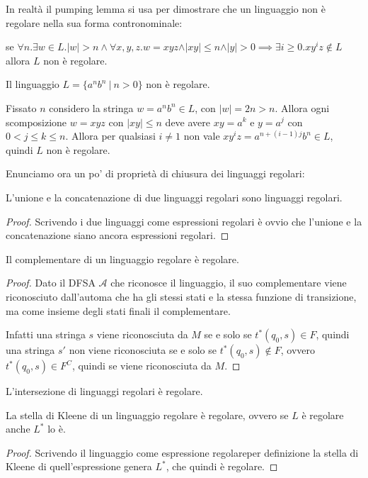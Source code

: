 \documentclass[12pt]{article}
\numberwithin{theorem}{subsection}
\begin{document}
In realtà il pumping lemma si usa per dimostrare che un linguaggio non è regolare nella sua forma contronominale:

se $\forall n . \exists w \in L . \vert w \vert > n \land \forall x, y, z . w = xyz \land \vert xy \vert \le n \land \vert y \vert > 0 \implies \exists i \ge 0 . xy^iz \notin L$ allora $L$ non è regolare.


\begin{example}
	Il linguaggio $L=\{ a^n b^n \ \vert \ n > 0 \}$ non è regolare.
	
	Fissato $n$ considero la stringa $w = a^nb^n \in L$, con $\vert w \vert = 2n > n$. Allora ogni scomposizione $w = xyz$ con $\vert xy \vert \le n$ deve avere $xy = a^k$ e $y = a^j$ con $0 < j \le k \le n$. Allora per qualsiasi $i \neq 1$ non vale $xy^iz = a^{n+(i-1)j}b^n \in L$, quindi $L$ non è regolare.
\end{example}

Enunciamo ora un po' di proprietà di chiusura dei linguaggi regolari:
\begin{prop}
	L'unione e la concatenazione di due linguaggi regolari sono linguaggi regolari.
\end{prop}
\begin{proof}
	Scrivendo i due linguaggi come espressioni regolari è ovvio che l'unione e la concatenazione siano ancora espressioni regolari.
\end{proof}

\begin{prop}
	Il complementare di un linguaggio regolare è regolare.
\end{prop}
\begin{proof}
	Dato il DFSA $\mathcal{A}$ che riconosce il linguaggio, il suo complementare viene riconosciuto dall'automa che ha gli stessi stati e la stessa funzione di transizione, ma come insieme degli stati finali il complementare.
	
	Infatti una stringa $s$ viene riconosciuta da $M$ se e solo se $t^*(q_0, s) \in F$, quindi una stringa $s'$ non viene riconosciuta se e solo se $t^*(q_0, s) \notin F$, ovvero $t^*(q_0, s) \in F^C$, quindi se viene riconosciuta da $M$.
\end{proof}

\begin{corollary}
	L'intersezione di linguaggi regolari è regolare.
\end{corollary}

\begin{prop}
	La stella di Kleene di un linguaggio regolare è regolare, ovvero se $L$ è regolare anche $L^*$ lo è.
\end{prop}
\begin{proof}
	Scrivendo il linguaggio come espressione regolareper definizione la stella di Kleene di quell'espressione genera $L^*$, che quindi è regolare.
\end{proof}
\end{document}
